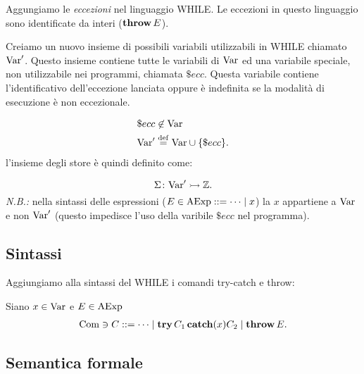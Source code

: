 Aggungiamo le \emph{eccezioni} nel linguaggio WHILE. Le eccezioni in
questo linguaggio sono identificate da interi ($\mathop{\textup{\textbf{throw}}} E$).

Creiamo un nuovo insieme di possibili variabili utilizzabili in WHILE
chiamato $\mathrm{Var}'$. Questo insieme contiene tutte le variabili di $\mathrm{Var}$
ed una variabile speciale, non utilizzabile nei programmi, chiamata
$\$ecc$. Questa variabile contiene l'identificativo dell'eccezione
lanciata oppure è indefinita se la modalità di esecuzione è non
eccezionale.

\begin{align*}
  &\$ecc \not \in \Var \\
  &\Var' \defeq \Var \union \{\$ecc\}.
\end{align*}
l'insieme degli store è quindi definito come:

\[
  \mathord{\Sigma}\colon\mathrm{Var}'\rightarrowtail\mathbb{Z}.
\]
\emph{N.B.:} nella sintassi delle espressioni ($E \in \AExp ::= \dots
\vbar x$) la $x$ appartiene a $\mathrm{Var}$ e non $\mathrm{Var}'$ (questo
impedisce l'uso della varibile $\$ecc$ nel programma).

\subsection{Sintassi}
Aggiungiamo alla sintassi del WHILE i comandi try-catch e throw:

Siano $x \in \mathrm{Var}$ e $E \in \mathrm{AExp}$
\begin{align*}
\Com \ni C ::= \dots \vbar \kw{try} C_1 \kw{catch}(x) C_2\vbar \kw{throw} E.
\end{align*}

\subsection{Semantica formale}

